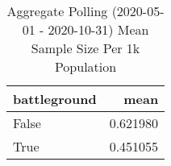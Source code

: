 \begin{table}
\centering
\caption{Aggregate Polling (2020-05-01 - 2020-10-31) Mean Sample Size Per 1k Population}
\begin{tabular}{lr}
\toprule
 battleground &      mean \\
\midrule
        False &  0.621980 \\
         True &  0.451055 \\
\bottomrule
\end{tabular}
\end{table}

